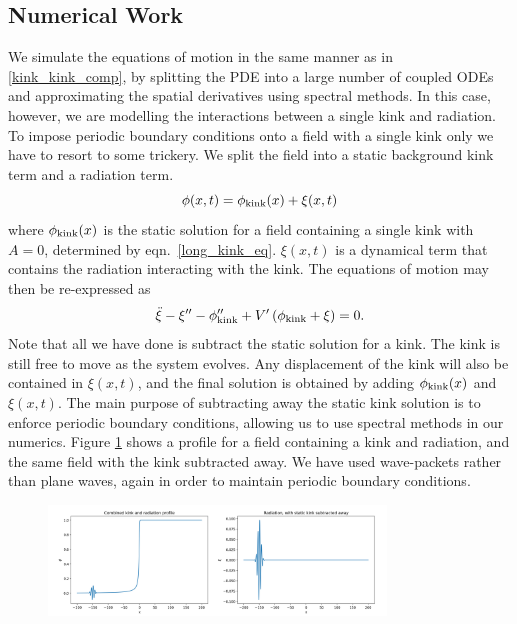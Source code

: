 \documentclass[11pt, oneside]{article}  	%
\numberwithin{equation}{section}
\begin{document}
 \subsection{Numerical Work} \label{kink_rad_numerics}
We simulate the equations of motion in the same manner as in \textsection \ref{kink_kink_comp}, by splitting the PDE into a large number of coupled ODEs and approximating the spatial derivatives using spectral methods. In this case, however, we are modelling the interactions between a single kink and radiation. To impose periodic boundary conditions onto a field with a single kink only we have to resort to some trickery. We split the field into a static background kink term and a radiation term.
\begin{equation}
\phi(x,t) = \phi_{\textup{kink}}(x) + \xi(x,t)
\end{equation}
where $\phi_{\textup{kink}}(x)$ is the static solution for a field containing a single kink with $A=0$, determined by eqn.~\ref{long_kink_eq}. $\xi(x,t)$ is a dynamical term that contains the radiation interacting with the kink. The equations of motion may then be re-expressed as
\begin{equation}
\ddot{\xi} - \xi'' - \phi''_\textup{kink} + V' \left( \phi_\textup{kink} + \xi \right)= 0.
\end{equation}
Note that all we have done is subtract the static solution for a kink. The kink is still free to move as the system evolves. Any displacement of the kink will also be contained in $\xi(x,t)$, and the final solution is obtained by adding $ \phi_{\textup{kink}}(x)$ and $\xi(x,t)$. The main purpose of subtracting away the static kink solution is to enforce periodic boundary conditions, allowing us to use spectral methods in our numerics. Figure \ref{kink-rad-init} shows a profile for a field containing a kink and radiation, and the same field with the kink subtracted away. We have used wave-packets rather than plane waves, again in order to maintain periodic boundary conditions.\par
\begin{figure}
\centering
\includegraphics[width=0.8\textwidth]{kink_rad_init}
 \label{kink-rad-init}
\end{figure}
\end{document}
